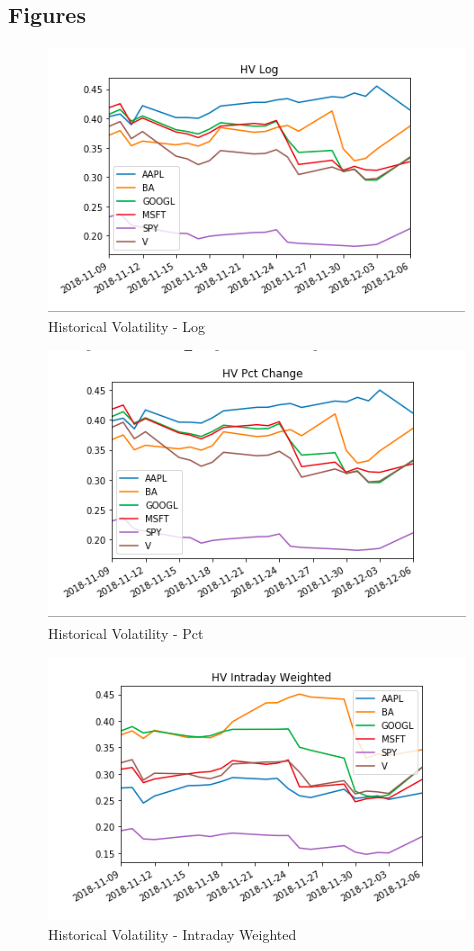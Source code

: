 \documentclass{article}
\begin{document}
\subsection{Figures}
\begin{figure}[h!]
\includegraphics[width =\textwidth]{images/HV/HV-LOG.png}
\caption{Historical Volatility - Log}
\centering
\end{figure}
\begin{figure}[h!]
\includegraphics[width =\textwidth]{images/HV/HV-PCT.png}
\caption{Historical Volatility - Pct}
\centering
\end{figure}
\begin{figure}[h!]
\includegraphics[width =\textwidth]{images/HV/HV_W.png}
\caption{Historical Volatility - Intraday Weighted}
\centering
\end{figure}
\end{document}
